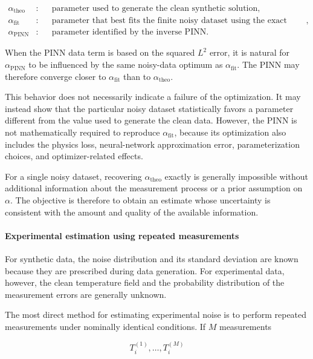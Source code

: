 \begin{align}
\alpha_{\mathrm{theo}}
&:
&&
\text{parameter used to generate the clean synthetic solution},
\\
\alpha_{\mathrm{fit}}
&:
&&
\text{parameter that best fits the finite noisy dataset using the exact model},
\\
\alpha_{\mathrm{PINN}}
&:
&&
\text{parameter identified by the inverse PINN}.
\end{align}

When the PINN data term is based on the squared $L^2$ error, it is natural for
$\alpha_{\mathrm{PINN}}$ to be influenced by the same noisy-data optimum as
$\alpha_{\mathrm{fit}}$. The PINN may therefore converge closer to
$\alpha_{\mathrm{fit}}$ than to $\alpha_{\mathrm{theo}}$.

This behavior does not necessarily indicate a failure of the optimization. It
may instead show that the particular noisy dataset statistically favors a
parameter different from the value used to generate the clean data. However,
the PINN is not mathematically required to reproduce
$\alpha_{\mathrm{fit}}$, because its optimization also includes the physics
loss, neural-network approximation error, parameterization choices, and
optimizer-related effects.

For a single noisy dataset, recovering $\alpha_{\mathrm{theo}}$ exactly is
generally impossible without additional information about the measurement
process or a prior assumption on $\alpha$. The objective is therefore to obtain
an estimate whose uncertainty is consistent with the amount and quality of the
available information.

\paragraph{Experimental estimation using repeated measurements}

For synthetic data, the noise distribution and its standard deviation are known
because they are prescribed during data generation. For experimental data,
however, the clean temperature field and the probability distribution of the
measurement errors are generally unknown.

The most direct method for estimating experimental noise is to perform repeated
measurements under nominally identical conditions. If $M$ measurements

\begin{equation}
T_i^{(1)},\ldots,T_i^{(M)}
\end{equation}

